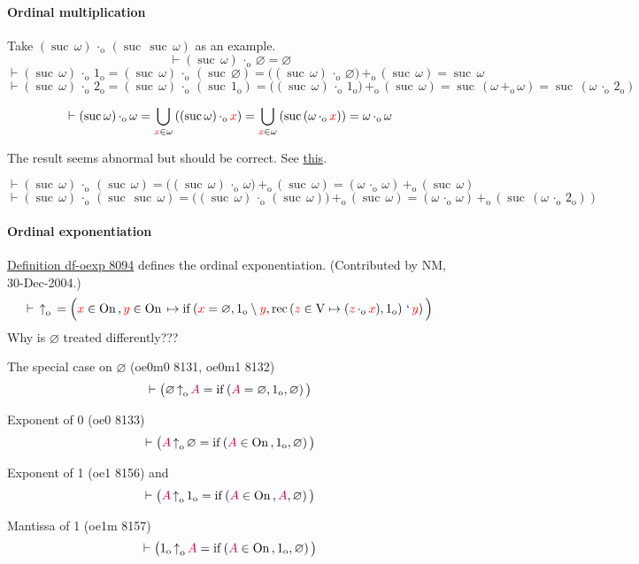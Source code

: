 \documentclass[12pt, letterpaper]{article}
\newcommand{\iunion}[2]{\bigcup_{#1}\left({#2}\right)}
\newcommand{\red}[1]{{\color{red} #1}}
\newcommand{\purple}[1]{{\color{purple} #1}}
\renewcommand{\emptyset}{\varnothing}
\newcommand{\dif}{\setminus}
\newcommand{\provable}{\vdash}
\newcommand{\setvar}{\red}
\newcommand{\classvar}{\purple}
\newcommand{\sx}{\setvar{x}}
\newcommand{\sy}{\setvar{y}}
\newcommand{\sz}{\setvar{z}}
\newcommand{\clA}{\classvar{A}}
\newcommand{\VV}{\mathrm{V}}
\newcommand{\cif}[3]{\operatorname{if}\left({#1},{#2},{#3}\right)}
\newcommand{\at}{\,`\,}
\newcommand{\ordsuf}[1]{{#1}_{\mathrm{o}}}
\newcommand{\pluso}{\,\ordsuf{+}\,}
\newcommand{\mulo}{\,\ordsuf{\cdot}\,}
\newcommand{\expo}{\,\ordsuf{\uparrow}\,}
\newcommand{\oneo}{\ordsuf{1}}
\newcommand{\twoo}{\ordsuf{2}}
\newcommand{\rec}[2]{\operatorname{rec}\left({#1},{#2}\right)}
\newcommand{\suc}{{\operatorname{suc}\,}}
\newcommand{\On}{{\operatorname{On}\,}}
\theoremstyle{definition}
\theoremstyle{remark}
\theoremstyle{definition}
\theoremstyle{plain}
\begin{document}
	\paragraph{Ordinal multiplication}
	Take $(\suc\omega)\mulo(\suc\suc\omega)$ as an example.
	\[\provable(\suc\omega)\mulo\emptyset=\emptyset
	\]
	\[\provable(\suc\omega)\mulo\oneo=(\suc\omega)\mulo(\suc\emptyset)=\big((\suc\omega)\mulo\emptyset\big)\pluso(\suc\omega)=\suc\omega
	\]
	\[\provable(\suc\omega)\mulo\twoo=(\suc\omega)\mulo(\suc\oneo)=\big((\suc\omega)\mulo\oneo\big)\pluso(\suc\omega)=\suc(\omega\pluso\omega)=\suc(\omega\mulo\twoo)
	\]
	
	\[\provable(\suc\omega)\mulo\omega=\iunion{\sx\in\omega}{(\suc\omega)\mulo\sx}=\iunion{\sx\in\omega}{\suc(\omega\mulo\sx)}=\omega\mulo\omega
	\]
	
	The result seems abnormal but should be correct. See \href{https://math.stackexchange.com/questions/1315179/ordinal-arithmetic-omega1-cdot-omega-and-omega-cdot-omega-1}{this}.
	
	\[\provable(\suc\omega)\mulo(\suc\omega)=\big((\suc\omega)\mulo\omega\big)\pluso(\suc\omega)=(\omega\mulo\omega)\pluso(\suc\omega)
	\]\[\provable(\suc\omega)\mulo(\suc\suc\omega)=\big((\suc\omega)\mulo(\suc\omega)\big)\pluso(\suc\omega)=(\omega\mulo\omega)\pluso(\suc(\omega\mulo\twoo))
	\]
	
	\paragraph{Ordinal exponentiation}
	\href{https://us.metamath.org/mpeuni/df-oexp.html}{Definition df-oexp 8094} defines the ordinal exponentiation.
	(Contributed by NM, 30-Dec-2004.)
	\[\provable
	\expo=\Big(
	\sx\in\On,\sy\in\On\mapsto\cif{\sx=\emptyset}
	{\oneo\dif\sy}{\rec{\sz\in\VV\mapsto(\sz\mulo\sx)}{\oneo}\at\sy}
	\Big)
	\]
	\red{Why is $\emptyset$ treated differently???}
	
	The special case on $\emptyset$ (oe0m0 8131, oe0m1 8132)
	\[\provable\big(\emptyset\expo\clA=
	\cif{\clA=\emptyset}{\oneo}{\emptyset}
	\big)
	\]
	
	Exponent of 0 (oe0 8133)
	\[\provable\big(\clA\expo\emptyset=
	\cif{\clA\in\On}{\oneo}{\emptyset}
	\big)
	\]
	
	Exponent of 1 (oe1 8156) and 
	\[\provable\big(\clA\expo\oneo=
	\cif{\clA\in\On}{\clA}{\emptyset}
	\big)
	\]
	
	Mantissa of 1 (oe1m 8157)
	\[\provable\big(\oneo\expo\clA=
	\cif{\clA\in\On}{\oneo}{\emptyset}
	\big)
	\]
	
\end{document}
